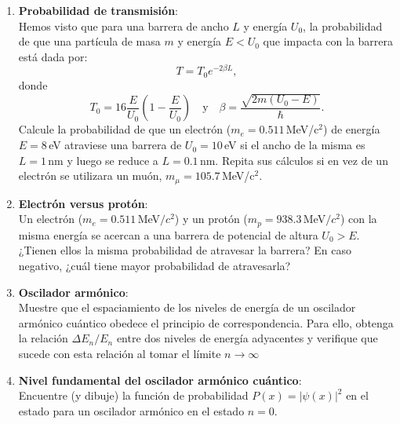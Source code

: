 \documentclass[a4paper,12pt]{article}
\begin{document}
\begin{enumerate}
	\item {\bf{Probabilidad de transmisión}}:\\
		Hemos visto que para una barrera de ancho $L$ y energía $U_0$, la
		probabilidad de que una partícula de masa $m$ y energía $E<U_0$ que
		impacta con la barrera está dada por:
		\[T=T_0 e^{-2 \beta L},\]
		donde
		\[T_0= 16 \frac{E}{U_0} \left (1 - \frac{E}{U_0} \right )
		\quad\mathrm{y}\quad 
		\beta = \frac{\sqrt{2 m (U_0 - E)}}{\hbar}.\]
		Calcule la probabilidad de que un electrón ($m_e=0.511$\,MeV/c$^2$) de
		energía $E=8$\,eV atraviese una barrera de $U_0=10$\,eV si el ancho de
		la misma es $L=1$\,nm y luego se reduce a $L=0.1$\,nm. Repita sus
		cálculos si en vez de un electrón se utilizara un muón,
		$m_\mu=105.7$\,MeV/c$^2$.

	\item {\bf{Electrón versus protón}}:\\
		Un electrón ($m_e=0.511$\,MeV$/c^2$) y un protón
		($m_p=938.3$\,MeV$/c^2$) con la misma energía se acercan a
		una barrera de potencial de altura $U_0>E$. ¿Tienen ellos la misma
		probabilidad de atravesar la barrera? En caso negativo, ¿cuál tiene
		mayor probabilidad de atravesarla?
	  
	\item {\bf{Oscilador armónico}}:\\
		Muestre que el espaciamiento de los niveles de energía de un
		oscilador armónico cuántico obedece el principio de correspondencia.
		Para ello, obtenga la relación $\Delta E_n/E_n$ entre dos niveles de
		energía adyacentes y verifique que sucede con esta relación al tomar el
		límite $n \to \infty$
	
	\item {\bf{Nivel fundamental del oscilador armónico cuántico}}:\\
		Encuentre (y dibuje) la función de probabilidad $P(x)=|\psi(x)|^2$ en
		el estado para un oscilador armónico en el estado $n=0$.
\end{enumerate}
\end{document}

